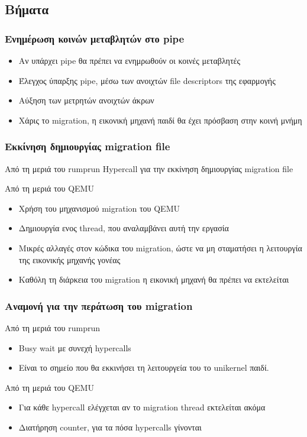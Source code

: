 \documentclass[red,slidestop,notes,compress,mathserif]{beamer}
\begin{document}
\subsection{Βήματα}

\begin{frame}
\frametitle{Ενημέρωση κοινών μεταβλητών στο pipe}
\begin{itemize}
\item Αν υπάρχει pipe θα πρέπει να ενημρωθούν οι κοινές μεταβλητές
\item Έλεγχος ύπαρξης pipe, μέσω των ανοιχτών file descriptors της εφαρμογής
\item Αύξηση των μετρητών ανοιχτών άκρων
\item Χάρις το migration, η εικονική μηχανή παιδί θα έχει πρόσβαση στην κοινή μνήμη
\end{itemize}
\end{frame}

\begin{frame}
\frametitle{Εκκίνηση δημιουργίας migration file}
\begin{block}{Από τη μεριά του rumprun}
Hypercall για την εκκίνηση δημιουργίας migration file
\end{block}
\begin{block}{Από τη μεριά του QEMU}
\begin{itemize}
\item Χρήση του μηχανισμού migration του QEMU
\item Δημιουργία ενος thread, που αναλαμβάνει αυτή την εργασία
\item Μικρές αλλαγές στον κώδικα του migration, ώστε να μη σταματήσει η λειτουργία της εικονικής μηχανής γονέας
\item Καθόλη τη διάρκεια του migration η εικονική μηχανή θα πρέπει να εκτελείται
\end{itemize}
\end{block}
\end{frame}

\begin{frame}
\frametitle{Αναμονή για την περάτωση του migration}
\begin{block}{Από τη μεριά του rumprun}
\begin{itemize}
\item Busy wait με συνεχή hypercalls
\item Είναι το σημείο που θα εκκινήσει τη λειτουργεία του το unikernel παιδί.
\end{itemize}
\end{block}
\begin{block}{Από τη μεριά του QEMU}
\begin{itemize}
\item Για κάθε hypercall ελέγχεται αν το migration thread εκτελείται ακόμα
\item Διατήρηση counter, για τα πόσα hypercalls γίνονται
\end{itemize}
\end{block}
\end{frame}
\end{document}
